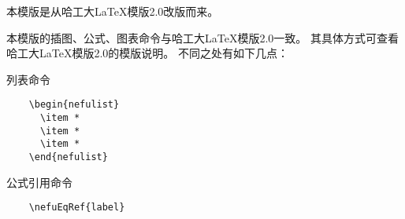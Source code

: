 

本模版是从哈工大\LaTeX 模版2.0改版而来。

本模版的插图、公式、图表命令与哈工大\LaTeX 模版2.0一致。
其具体方式可查看哈工大\LaTeX 模版2.0的模版说明。
不同之处有如下几点：
\begin{nefulist}
  \item 列表命令
  
  \begin{verbatim}
    \begin{nefulist}
      \item *
      \item *
      \item *      
    \end{nefulist}
  \end{verbatim}
  \item 公式引用命令
  
  \begin{verbatim}
    \nefuEqRef{label}
  \end{verbatim}
\end{nefulist}
